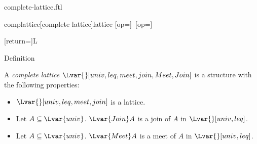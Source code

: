 \documentclass{naproche-library}
\begin{document}
\begin{smodule}[title=Complete Lattices]{complete-lattice.ftl}
\STEXexport{
  \let\Join\relax
}
\begin{extstructure}{complattice}[complete lattice]{lattice}
  [op=\bigvee]{\bigvee\,}
  [op=\bigwedge]{\bigwedge\,}
\end{extstructure}
[return={\complattice[comp=##1]}]{\mathcal L}

\begin{sfragment}{Definition}
  \begin{signature}[forthel,id=CompleteLatticeSig]
    A \emph{complete lattice $\Lvar{}[univ,leq,meet,join,Meet,Join]$} is a structure with the following properties:

    \begin{itemize}
      \item \label{compLatticeSig}
        $\Lvar{}[univ,leq,meet,join]$ is a lattice.

      \item \label{compLatticeJoinSig}
        Let $A\subseteq\Lvar{univ}$.
        ${\Lvar{Join}}A$ is a join of $A$ in $\Lvar{}[univ,leq]$.

      \item \label{compLatticeMeetSig}
        Let $A\subseteq\Lvar{univ}$.
        ${\Lvar{Meet}}A$ is a meet of $A$ in $\Lvar{}[univ,leq]$.
    \end{itemize}
  \end{signature}
\end{sfragment}



\end{smodule}
\end{document}
